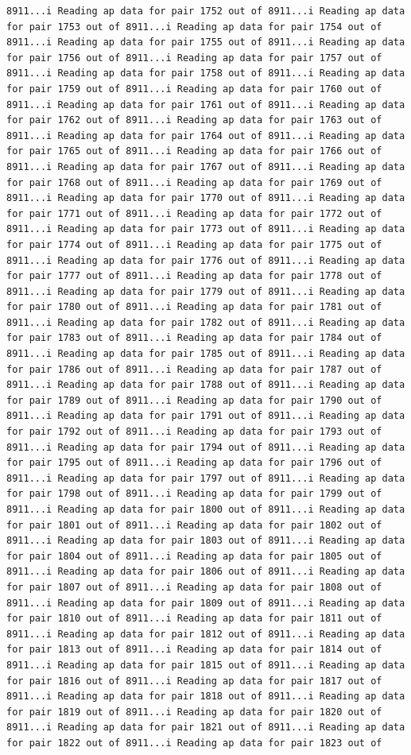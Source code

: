\documentclass[
]{article}
\begin{document}
\begin{verbatim}
8911...i Reading ap data for pair 1752 out of 8911...i Reading ap data for pair 1753 out of 8911...i Reading ap data for pair 1754 out of 8911...i Reading ap data for pair 1755 out of 8911...i Reading ap data for pair 1756 out of 8911...i Reading ap data for pair 1757 out of 8911...i Reading ap data for pair 1758 out of 8911...i Reading ap data for pair 1759 out of 8911...i Reading ap data for pair 1760 out of 8911...i Reading ap data for pair 1761 out of 8911...i Reading ap data for pair 1762 out of 8911...i Reading ap data for pair 1763 out of 8911...i Reading ap data for pair 1764 out of 8911...i Reading ap data for pair 1765 out of 8911...i Reading ap data for pair 1766 out of 8911...i Reading ap data for pair 1767 out of 8911...i Reading ap data for pair 1768 out of 8911...i Reading ap data for pair 1769 out of 8911...i Reading ap data for pair 1770 out of 8911...i Reading ap data for pair 1771 out of 8911...i Reading ap data for pair 1772 out of 8911...i Reading ap data for pair 1773 out of 8911...i Reading ap data for pair 1774 out of 8911...i Reading ap data for pair 1775 out of 8911...i Reading ap data for pair 1776 out of 8911...i Reading ap data for pair 1777 out of 8911...i Reading ap data for pair 1778 out of 8911...i Reading ap data for pair 1779 out of 8911...i Reading ap data for pair 1780 out of 8911...i Reading ap data for pair 1781 out of 8911...i Reading ap data for pair 1782 out of 8911...i Reading ap data for pair 1783 out of 8911...i Reading ap data for pair 1784 out of 8911...i Reading ap data for pair 1785 out of 8911...i Reading ap data for pair 1786 out of 8911...i Reading ap data for pair 1787 out of 8911...i Reading ap data for pair 1788 out of 8911...i Reading ap data for pair 1789 out of 8911...i Reading ap data for pair 1790 out of 8911...i Reading ap data for pair 1791 out of 8911...i Reading ap data for pair 1792 out of 8911...i Reading ap data for pair 1793 out of 8911...i Reading ap data for pair 1794 out of 8911...i Reading ap data for pair 1795 out of 8911...i Reading ap data for pair 1796 out of 8911...i Reading ap data for pair 1797 out of 8911...i Reading ap data for pair 1798 out of 8911...i Reading ap data for pair 1799 out of 8911...i Reading ap data for pair 1800 out of 8911...i Reading ap data for pair 1801 out of 8911...i Reading ap data for pair 1802 out of 8911...i Reading ap data for pair 1803 out of 8911...i Reading ap data for pair 1804 out of 8911...i Reading ap data for pair 1805 out of 8911...i Reading ap data for pair 1806 out of 8911...i Reading ap data for pair 1807 out of 8911...i Reading ap data for pair 1808 out of 8911...i Reading ap data for pair 1809 out of 8911...i Reading ap data for pair 1810 out of 8911...i Reading ap data for pair 1811 out of 8911...i Reading ap data for pair 1812 out of 8911...i Reading ap data for pair 1813 out of 8911...i Reading ap data for pair 1814 out of 8911...i Reading ap data for pair 1815 out of 8911...i Reading ap data for pair 1816 out of 8911...i Reading ap data for pair 1817 out of 8911...i Reading ap data for pair 1818 out of 8911...i Reading ap data for pair 1819 out of 8911...i Reading ap data for pair 1820 out of 8911...i Reading ap data for pair 1821 out of 8911...i Reading ap data for pair 1822 out of 8911...i Reading ap data for pair 1823 out of 
\end{verbatim}
\end{document}
